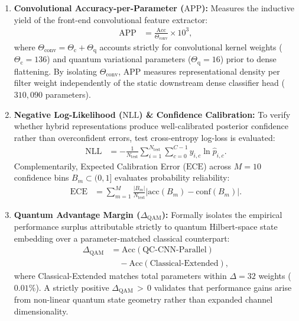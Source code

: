 \documentclass[journal]{IEEEtran}
\begin{document}
\begin{enumerate}
    \item \textbf{Convolutional Accuracy-per-Parameter ($\mathrm{APP}$):} Measures the inductive yield of the front-end convolutional feature extractor:
    \begin{align}
    \mathrm{APP} &= \frac{\mathrm{Acc}}{\Theta_{\mathrm{conv}}} \times 10^3,
    \label{eq:app_metric_exp2}
    \end{align}
    where $\Theta_{\mathrm{conv}} = \Theta_{\mathrm{c}} + \Theta_{\mathrm{q}}$ accounts strictly for convolutional kernel weights ($\Theta_{\mathrm{c}} = 136$) and quantum variational parameters ($\Theta_{\mathrm{q}} = 16$) prior to dense flattening. By isolating $\Theta_{\mathrm{conv}}$, $\mathrm{APP}$ measures representational density per filter weight independently of the static downstream dense classifier head ($310{,}090$ parameters).

    \item \textbf{Negative Log-Likelihood ($\mathrm{NLL}$) \& Confidence Calibration:} To verify whether hybrid representations produce well-calibrated posterior confidence rather than overconfident errors, test cross-entropy log-loss is evaluated:
    \begin{align}
    \mathrm{NLL} &= -\frac{1}{N_{\mathrm{test}}} \sum_{i=1}^{N_{\mathrm{test}}} \sum_{c=0}^{C-1} y_{i,c} \ln \hat{p}_{i,c}.
    \label{eq:nll_metric}
    \end{align}
    Complementarily, Expected Calibration Error ($\mathrm{ECE}$) across $M = 10$ confidence bins $B_m \subset (0, 1]$ evaluates probability reliability:
    \begin{align}
    \mathrm{ECE} &= \sum_{m=1}^{M} \frac{|B_m|}{N_{\mathrm{test}}} \big| \mathrm{acc}(B_m) - \mathrm{conf}(B_m) \big|.
    \label{eq:ece_metric}
    \end{align}

    \item \textbf{Quantum Advantage Margin ($\Delta_{\mathrm{QAM}}$):} Formally isolates the empirical performance surplus attributable strictly to quantum Hilbert-space state embedding over a parameter-matched classical counterpart:
    \begin{align}
    \Delta_{\mathrm{QAM}} &= \mathrm{Acc}(\text{QC-CNN-Parallel}) \nonumber \\
    &\quad - \mathrm{Acc}(\text{Classical-Extended}),
    \label{eq:qam_metric}
    \end{align}
    where Classical-Extended matches total parameters within $\Delta = 32$ weights ($0.01\%$). A strictly positive $\Delta_{\mathrm{QAM}} \,{>}\, 0$ validates that performance gains arise from non-linear quantum state geometry rather than expanded channel dimensionality.


\end{enumerate}
\end{document}
